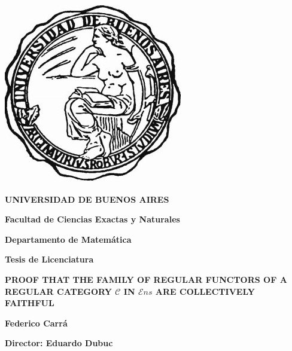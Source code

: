 





%
\thispagestyle{empty}

\begin {center}

\includegraphics[scale=.3]{uba2.jpg}

\medskip
\textbf{UNIVERSIDAD DE BUENOS AIRES}

\smallskip

\textbf{Facultad de Ciencias Exactas y Naturales}

\smallskip

\textbf{Departamento de Matem\'atica}

\vspace{3.5cm}

\textbf{\large Tesis de Licenciatura}


\vspace{1.5cm}

\textbf{\large PROOF THAT THE FAMILY OF REGULAR FUNCTORS OF A REGULAR CATEGORY $\mathcal{C}$ IN $\mathcal{E}ns$ ARE COLLECTIVELY FAITHFUL}

\vspace{1.5cm}


\textbf{Federico Carr\'a}

\end {center}


\vspace{1.5cm}

\noindent \textbf{Director: Eduardo Dubuc} 


\vspace{3cm}



%

